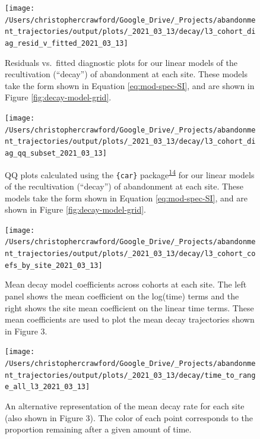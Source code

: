 \documentclass[
]{article}
\begin{document}
\begin{figure}
\texttt{[image: /Users/christophercrawford/Google\_Drive/\_Projects/abandonment\_trajectories/output/plots/\_2021\_03\_13/decay/l3\_cohort\_diag\_resid\_v\_fitted\_2021\_03\_13]} \caption{Residuals vs.~fitted diagnostic plots for our linear models of the recultivation (``decay'') of abandonment at each site. These models take the form shown in Equation \eqref{eq:mod-spec-SI}, and are shown in Figure \ref{fig:decay-model-grid}.}\label{fig:diag-resid-fitted}
\end{figure}



\begin{figure}
\texttt{[image: /Users/christophercrawford/Google\_Drive/\_Projects/abandonment\_trajectories/output/plots/\_2021\_03\_13/decay/l3\_cohort\_diag\_qq\_subset\_2021\_03\_13]} \caption{QQ plots calculated using the \texttt{\{car\}} package\textsuperscript{\protect\hyperlink{ref-R-car}{14}} for our linear models of the recultivation (``decay'') of abandonment at each site. These models take the form shown in Equation \eqref{eq:mod-spec-SI}, and are shown in Figure \ref{fig:decay-model-grid}.}\label{fig:diag-qq}
\end{figure}



\begin{figure}
\texttt{[image: /Users/christophercrawford/Google\_Drive/\_Projects/abandonment\_trajectories/output/plots/\_2021\_03\_13/decay/l3\_cohort\_coefs\_by\_site\_2021\_03\_13]} \caption{Mean decay model coefficients across cohorts at each site. The left panel shows the mean coefficient on the log(time) terms and the right shows the site mean coefficient on the linear time terms. These mean coefficients are used to plot the mean decay trajectories shown in Figure 3.}\label{fig:decay-mod-coef}
\end{figure}



\begin{figure}
\texttt{[image: /Users/christophercrawford/Google\_Drive/\_Projects/abandonment\_trajectories/output/plots/\_2021\_03\_13/decay/time\_to\_range\_all\_l3\_2021\_03\_13]} \caption{An alternative representation of the mean decay rate for each site (also shown in Figure 3). The color of each point corresponds to the proportion remaining after a given amount of time.}\label{fig:decay-time-to-range}
\end{figure}
\end{document}
